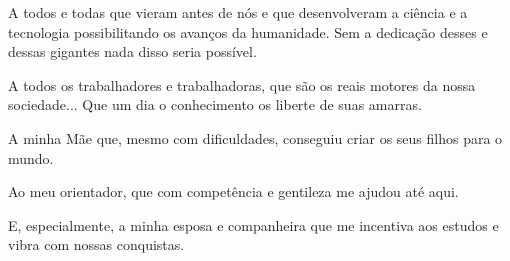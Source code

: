 \begin{agradecimentos}
	\par A todos e todas que vieram antes de nós e que desenvolveram a ciência e a tecnologia possibilitando os avanços da humanidade.  Sem a dedicação desses e dessas gigantes nada disso seria possível.
	\par A todos os trabalhadores e trabalhadoras, que são os reais motores da nossa sociedade... Que um dia o conhecimento os liberte de suas amarras.
	\par A minha Mãe que, mesmo com dificuldades, conseguiu criar os seus filhos para o mundo.
	\par Ao meu orientador, que com competência e gentileza me ajudou até aqui.\\
	\par E, especialmente, a minha esposa e companheira que me incentiva aos estudos e vibra com nossas conquistas.
\end{agradecimentos}